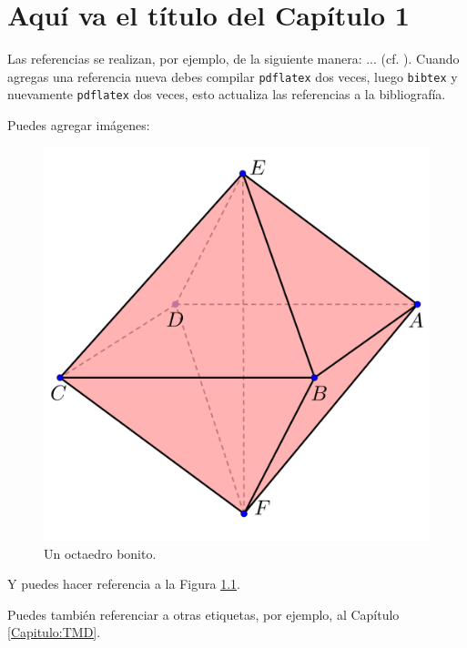 \chapter{Aqu\'i va el t\'itulo del Cap\'itulo 1}

\noindent Las referencias se realizan, por ejemplo, de la siguiente manera: ... (cf. \cite{Abraham-Marsden-Ratiu:MTAA}). Cuando agregas una referencia nueva debes compilar \texttt{pdflatex} dos veces, luego \texttt{bibtex} y nuevamente \texttt{pdflatex} dos veces, esto actualiza las referencias a la bibliograf\'ia.
\bigskip

Puedes agregar im\'agenes:

\begin{figure}[h]
\begin{center}
\includegraphics[width=0.5\linewidth]{./figures/octaedro.png}
\end{center}
\caption{Un octaedro bonito.}
\label{octaedro}
\end{figure}

Y puedes hacer referencia a la Figura \ref{octaedro}.

Puedes tambi\'en referenciar a otras etiquetas, por ejemplo, al Cap\'itulo \ref{Capitulo:TMD}.


